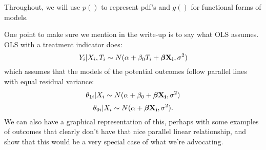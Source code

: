 \documentclass[oneside,letterpaper,titlepage,12pt]{article}
\begin{document}
Throughout, we will use $p()$ to represent pdf's and $g()$ for functional forms of models.

One point to make sure we mention in the write-up is to say what OLS assumes.  OLS with a treatment indicator does:
$$Y_i|X_i, T_i \sim N(\alpha + \beta_0 T_i + {\boldsymbol \beta} {\bf X_i}, \sigma^2)$$
which assumes that the models of the potential outcomes follow parallel lines with equal residual variance:
$$\theta_{1i}|X_i \sim N(\alpha + \beta_0 + {\boldsymbol \beta} {\bf X_i}, \sigma^2)$$
$$\theta_{0i}|X_i \sim N(\alpha + {\boldsymbol \beta} {\bf X_i}, \sigma^2).$$
We can also have a graphical representation of this, perhaps with some examples of outcomes that clearly don't have that nice parallel linear relationship,
and show that this would be a very special case of what we're advocating.
\end{document}
